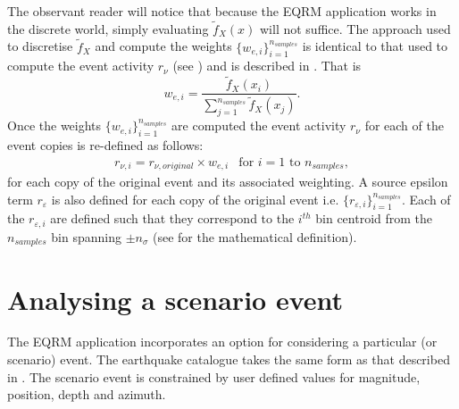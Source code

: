 The observant reader will notice that because the EQRM application
works in the discrete world, simply evaluating $\tilde{f}_X(x)$
will not suffice. The approach used 
to discretise $\tilde{f}_X$ and compute the weights
$\{w_{e,i}\}_{i=1}^{n_{samples}}$ is identical to that used to
compute the event activity $r_\nu$ (see
) and is described in
. That is
\begin{equation}
w_{e,i} = \frac{\tilde{f}_X(x_i)}{\sum\limits_{j=1}^{n_{samples}}
\tilde{f}_X(x_j)}.
\end{equation}
Once the weights $\{w_{e,i}\}_{i=1}^{n_{samples}}$ are computed
the event activity $r_\nu$ for each of the event copies is
re-defined as follows:
\begin{equation}
\label{source:spawning-activity}
\begin{array}{ll}
r_{\nu,i} = r_{\nu,original} \times w_{e,i} & \textrm{for } i=1
\textrm{ to } n_{samples},
\end{array}
\end{equation}
for each copy of the original event and its associated weighting.
A source epsilon term $r_\varepsilon$ is also defined for each
copy of the original event i.e.
$\{r_{\varepsilon,i}\}_{i=1}^{n_{samples}}$. Each of the
$r_{\varepsilon,i}$ are defined such that they correspond to the
$i^{th}$ bin centroid from the $n_{samples}$ bin spanning $\pm
n_\sigma$ (see  for the mathematical
definition).


\section{Analysing a scenario event}
\label{sec:source-scenario} The EQRM application incorporates an option for considering
a particular (or scenario) event. The earthquake catalogue takes the same
form as that described in . The scenario
event is constrained by user defined values for magnitude, position,
depth and azimuth.




